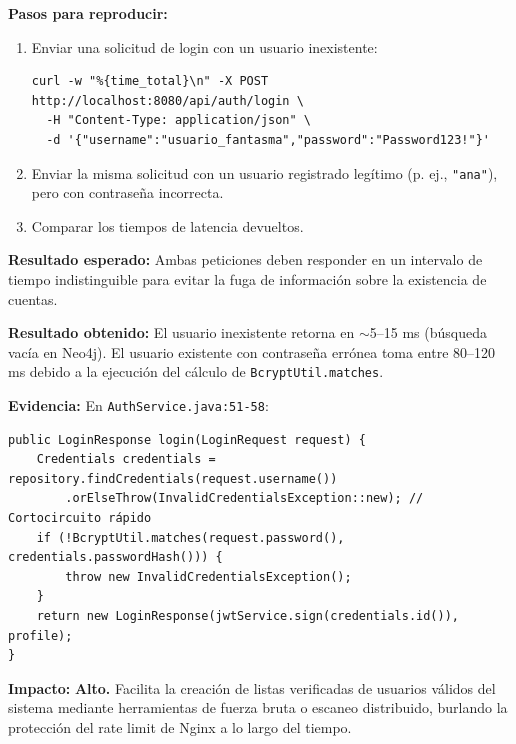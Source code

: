 \documentclass[10pt,a4paper]{article}
\newcommand{\code}[1]{\nolinkurl{#1}}
\begin{document}
\noindent\textbf{Pasos para reproducir:}
\begin{enumerate}[leftmargin=*]
    \item Enviar una solicitud de login con un usuario inexistente:
    \begin{tcolorbox}[colback=codebg,colframe=gray!40,arc=1mm]\small
\begin{verbatim}
curl -w "%{time_total}\n" -X POST http://localhost:8080/api/auth/login \
  -H "Content-Type: application/json" \
  -d '{"username":"usuario_fantasma","password":"Password123!"}'
\end{verbatim}
    \end{tcolorbox}
    \item Enviar la misma solicitud con un usuario registrado legítimo (p. ej., \code{"ana"}), pero con contraseña incorrecta.
    \item Comparar los tiempos de latencia devueltos.
\end{enumerate}

\noindent\textbf{Resultado esperado:}
Ambas peticiones deben responder en un intervalo de tiempo indistinguible para evitar la fuga de información sobre la existencia de cuentas.

\noindent\textbf{Resultado obtenido:}
El usuario inexistente retorna en $\sim$5--15 ms (búsqueda vacía en Neo4j). El usuario existente con contraseña errónea toma entre 80--120 ms debido a la ejecución del cálculo de \code{BcryptUtil.matches}.

\noindent\textbf{Evidencia:}
En \code{AuthService.java:51-58}:
\begin{tcolorbox}[colback=codebg,colframe=gray!40,arc=1mm]\small
\begin{verbatim}
public LoginResponse login(LoginRequest request) {
    Credentials credentials = repository.findCredentials(request.username())
        .orElseThrow(InvalidCredentialsException::new); // Cortocircuito rápido
    if (!BcryptUtil.matches(request.password(), credentials.passwordHash())) {
        throw new InvalidCredentialsException();
    }
    return new LoginResponse(jwtService.sign(credentials.id()), profile);
}
\end{verbatim}
\end{tcolorbox}

\noindent\textbf{Impacto:}
\textbf{Alto.} Facilita la creación de listas verificadas de usuarios válidos del sistema mediante herramientas de fuerza bruta o escaneo distribuido, burlando la protección del rate limit de Nginx a lo largo del tiempo.
\end{document}
